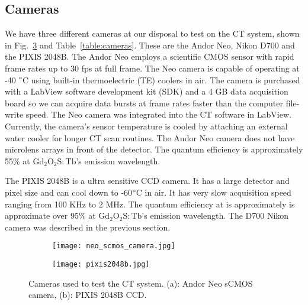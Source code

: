 \begin{figure}
\begin{floatrow}
\end{floatrow}

\end{figure}

\subsection{Cameras}
We have three different cameras at our disposal to test on the CT system, shown in Fig.~\ref{fig:cameras} and Table~\ref{table:cameras}.  These are the Andor Neo, Nikon D700 and the PIXIS 2048B.  The Andor Neo employs a scientific CMOS sensor with rapid frame rates up to 30 fps at full frame.  The Neo camera is capable of operating at -40 $\degree$C using built-in thermoelectric (TE) coolers in air.  The camera is purchased with a LabView software development kit (SDK) and a 4 GB data acquisition board so we can acquire data bursts at frame rates faster than the computer file-write speed.  The Neo camera was integrated into the CT software in LabView.  Currently, the camera's sensor temperature is cooled by attaching an external water cooler for longer CT scan routines.  The Andor Neo camera does not have microlens arrays in front of the detector.  The quantum efficiency is approximately 55\% at $\mathrm{Gd_2O_2S:Tb}$'s emission wavelength.


The PIXIS 2048B is a ultra sensitive CCD camera.  It has a large detector and pixel size and can cool down to -60$\degree$C in air.  It has very slow acquisition speed ranging from 100 KHz to 2 MHz.  The quantum efficiency at is approximately is approximate over 95\% at $\mathrm{Gd_2O_2S:Tb}$'s emission wavelength. The D700 Nikon camera was described in the previous section.

\begin{figure}
	\begin{subfigure}[b]{0.45\linewidth}
	\centering
	\texttt{[image: neo\_scmos\_camera.jpg]}
	\caption{}
	\label{fig:neo}
	\end{subfigure}
\hspace{1 cm}	
	\begin{subfigure}[b]{0.45\linewidth}
	\centering
	\texttt{[image: pixis2048b.jpg]}
	\caption{}
	\label{fig:pixis}
	\end{subfigure}
\caption{Cameras used to test the CT system. (a): Andor Neo sCMOS camera, (b): PIXIS 2048B CCD.}
\label{fig:cameras}
\end{figure}


